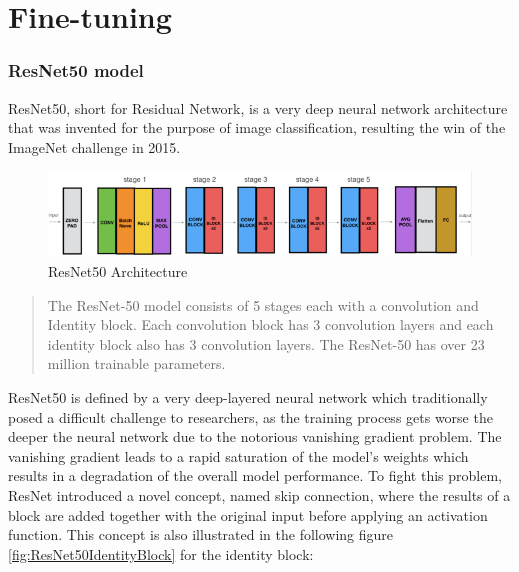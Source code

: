 \section{Fine-tuning}
\subsubsection{ResNet50 model}
ResNet50, short for Residual Network, is a very deep neural network architecture that was invented for the purpose of image classification, resulting the win of the ImageNet challenge in 2015. \citep{Dwivedi:2019:ResNetInKeras}

\begin{figure}[H]
  \begin{center}
  \includegraphics[angle=0, width=1.0\textwidth]{Figures/resnet50.png}
  \caption{ResNet50 Architecture \citep{Dwivedi:2019:ResNetInKeras}}
  \label{fig:ResNet50Architecture}
  \end{center}
\end{figure}

\begin{quote}
    The ResNet-50 model consists of 5 stages each with a convolution and Identity block. Each convolution block has 3 convolution layers and each identity block also has 3 convolution layers. The ResNet-50 has over 23 million trainable parameters. \citep[~para. 14]{Dwivedi:2019:ResNetInKeras}
\end{quote}

ResNet50 is defined by a very deep-layered neural network which traditionally posed a difficult challenge to researchers, as the training process gets worse the deeper the neural network due to the notorious vanishing gradient problem. The vanishing gradient leads to a rapid saturation of the model's weights which results in a degradation of the overall model performance. To fight this problem, ResNet introduced a novel concept, named skip connection, where the results of a block are added together with the original input before applying an activation function. \citep{Dwivedi:2019:ResNetInKeras}
\newline\newline
This concept is also illustrated in the following figure \ref{fig:ResNet50IdentityBlock} for the identity block:

